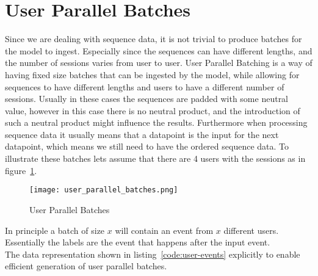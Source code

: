 \section{User Parallel Batches}
Since we are dealing with sequence data, it is not trivial to produce batches for the model to ingest.
Especially since the sequences can have different lengths, and the number of sessions varies from user to user.
User Parallel Batching is a way of having fixed size batches that can be ingested by the model, while allowing for sequences to have different lengths and users to have a different number of sessions.
Usually in these cases the sequences are padded with some neutral value, however in this case there is no neutral product, and the introduction of such a neutral product might influence the results.
Furthermore when processing sequence data it usually means that a datapoint is the input for the next datapoint, which means we still need to have the ordered sequence data.
To illustrate these batches lets assume that there are 4 users with the sessions as in figure~\ref{fig:user_parallel_batches}.

\begin{figure}[h]
	\centering
	\captionsetup{width=0.8\textwidth}
    \texttt{[image: user\_parallel\_batches.png]}
    \caption{User Parallel Batches}
    \label{fig:user_parallel_batches}
\end{figure}

In principle a batch of size $x$ will contain an event from $x$ different users.
Essentially the labels are the event that happens after the input event.
\\
The data representation shown in listing~\ref{code:user-events} explicitly to enable efficient generation of user parallel batches.
